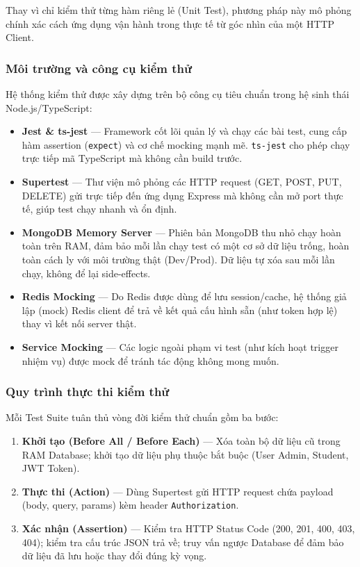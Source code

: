 Thay vì chỉ kiểm thử từng hàm riêng lẻ (Unit Test), phương pháp này mô phỏng
chính xác cách ứng dụng vận hành trong thực tế từ góc nhìn của một HTTP Client.

\subsubsection{Môi trường và công cụ kiểm thử}

Hệ thống kiểm thử được xây dựng trên bộ công cụ tiêu chuẩn trong hệ sinh thái
Node.js/TypeScript:

\begin{itemize}[leftmargin=*]
  \item \textbf{Jest \& ts-jest} --- Framework cốt lõi quản lý và chạy các bài test,
        cung cấp hàm assertion (\texttt{expect}) và cơ chế mocking mạnh mẽ.
        \texttt{ts-jest} cho phép chạy trực tiếp mã TypeScript mà không cần build trước.
  \item \textbf{Supertest} --- Thư viện mô phỏng các HTTP request (GET, POST, PUT, DELETE)
        gửi trực tiếp đến ứng dụng Express mà không cần mở port thực tế, giúp test
        chạy nhanh và ổn định.
  \item \textbf{MongoDB Memory Server} --- Phiên bản MongoDB thu nhỏ chạy hoàn toàn
        trên RAM, đảm bảo mỗi lần chạy test có một cơ sở dữ liệu trống, hoàn toàn
        cách ly với môi trường thật (Dev/Prod). Dữ liệu tự xóa sau mỗi lần chạy,
        không để lại side-effects.
  \item \textbf{Redis Mocking} --- Do Redis được dùng để lưu session/cache, hệ thống
        giả lập (mock) Redis client để trả về kết quả cấu hình sẵn (như token hợp lệ)
        thay vì kết nối server thật.
  \item \textbf{Service Mocking} --- Các logic ngoài phạm vi test (như kích hoạt
        trigger nhiệm vụ) được mock để tránh tác động không mong muốn.
\end{itemize}

\subsubsection{Quy trình thực thi kiểm thử}

Mỗi Test Suite tuân thủ vòng đời kiểm thử chuẩn gồm ba bước:

\begin{enumerate}[leftmargin=*]
  \item \textbf{Khởi tạo (Before All / Before Each)} --- Xóa toàn bộ dữ liệu cũ trong
        RAM Database; khởi tạo dữ liệu phụ thuộc bắt buộc (User Admin, Student, JWT Token).
  \item \textbf{Thực thi (Action)} --- Dùng Supertest gửi HTTP request chứa payload
        (body, query, params) kèm header \texttt{Authorization}.
  \item \textbf{Xác nhận (Assertion)} --- Kiểm tra HTTP Status Code (200, 201, 400,
        403, 404); kiểm tra cấu trúc JSON trả về; truy vấn ngược Database để đảm bảo
        dữ liệu đã lưu hoặc thay đổi đúng kỳ vọng.
\end{enumerate}

